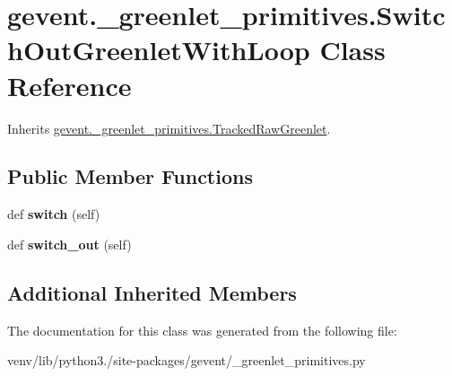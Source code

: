 \hypertarget{classgevent_1_1__greenlet__primitives_1_1_switch_out_greenlet_with_loop}{}\section{gevent.\+\_\+greenlet\+\_\+primitives.\+Switch\+Out\+Greenlet\+With\+Loop Class Reference}
\label{classgevent_1_1__greenlet__primitives_1_1_switch_out_greenlet_with_loop}


Inherits \hyperlink{classgevent_1_1__greenlet__primitives_1_1_tracked_raw_greenlet}{gevent.\+\_\+greenlet\+\_\+primitives.\+Tracked\+Raw\+Greenlet}.

\subsection*{Public Member Functions}
\begin{DoxyCompactItemize}
\item 
\mbox{\label{classgevent_1_1__greenlet__primitives_1_1_switch_out_greenlet_with_loop_a91a04a7c517bd9d439fc53e1acf51f87}} 
def {\bfseries switch} (self)
\item 
\mbox{\label{classgevent_1_1__greenlet__primitives_1_1_switch_out_greenlet_with_loop_aebbe71633cb6b970eaa4048fad495878}} 
def {\bfseries switch\+\_\+out} (self)
\end{DoxyCompactItemize}
\subsection*{Additional Inherited Members}


The documentation for this class was generated from the following file\+:\begin{DoxyCompactItemize}
\item 
venv/lib/python3./site-\/packages/gevent/\+\_\+greenlet\+\_\+primitives.\+py\end{DoxyCompactItemize}
